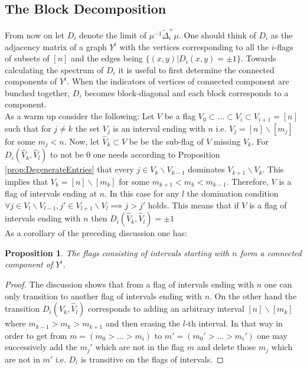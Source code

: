 \documentclass[11pt]{amsart}
\newtheorem{proposition}[theorem]{Proposition}
\begin{document}
    \subsection{The Block Decomposition}
    \label{sec:TheBlock}
    From now on let $D_i$ denote the limit of $\mu^{-1}\tilde{\Delta}_i^+\mu$.
    One should think of $D_i$ as the adjacency matrix of a graph $Y^i$ with the vertices corresponding to all the $i$-flags of subsets of $[n]$ and the edges being $\{(x,y)|D_i(x,y)=\pm1\}$. Towards calculating the spectrum of $D_i$ it is useful to first determine the connected components of $Y^i$. When the indicators of vertices of connected component are bunched together, $D_i$ becomes block-diagonal and each  block corresponds to a component.\\
    
     As a warm up consider the following: Let $V$  be a flag $V_0\subset\dots\subset V_i\subset V_{i+1}=[n]$ such that for $j\neq k$ the set $V_j$ is an interval ending with $n$ i.e. $V_j=[n]\backslash[m_j]$ for some $m_j<n$. Now, let $\hat{V}_k\subset V$ be be the sub-flag of $V$ missing $V_k$. For $D_i(\hat{V}_k, \hat{V}_l)$ to not be $0$ one needs according to Proposition \ref{prop:DegenerateEntries} that every $j\in V_k\backslash V_{k-1}$ dominates $V_{k+1}\backslash V_k$. This implies that $V_k=[n]\backslash[m_k]$ for some $m_{k+1}<m_k<m_{k-1}$. Therefore, $V$ is a flag of intervals ending at $n$. In this case for any $l$ the domination condition $\forall j\in V_l\backslash V_{l-1},j'\in V_{l+1}\backslash V_l\implies j>j'$ holds. This means that if $V$ is a flag of intervals ending with $n$ then $D_i(\hat{V}_k,\hat{V}_l)=\pm1$\\
    As a corollary of the preceding discussion one has:
    \begin{proposition}
        The flags consisting of intervals starting with $n$ form a connected component of $Y^i$.
        \label{prop:EmptyCharacter}
    \end{proposition}
    \begin{proof}
        The discussion shows that from a flag of intervals ending with $n$ one can only transition to another flag of intervals ending with $n$. On the other hand the transition $D_i(\hat{V}_k,\hat{V}_l)$ corresponds to adding an arbitrary interval $[n]\backslash[m_k]$ where $m_{k-1}>m_k>m_{k+1}$ and then erasing the $l$-th interval. In that way in order to get from $m=(m_0>\dots>m_i)$ to $m'=(m_0'>\dots>m_i')$ one may successively add the $m_j'$ which are not in the flag $m$ and delete those $m_j$ which are not in $m'$ i.e. $D_i$ is transitive on the flags of intervals. 
    \end{proof}   
\end{document}
